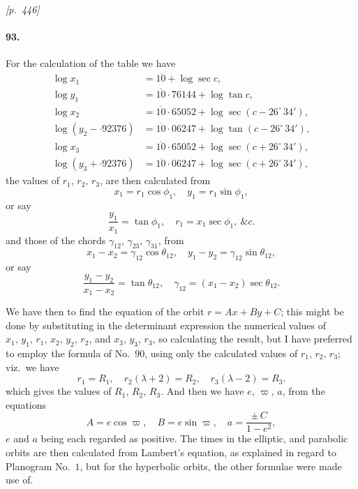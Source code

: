 \documentclass[11pt]{article}
\begin{document}
\medskip
\noindent\textit{[p.~446]}

\medskip

\paragraph{93.} For the calculation of the table we have
\[
\begin{aligned}
\log x_{1} &= \overline{10} + \log\sec c,\\
\log y_{1} &= \overline{10}{\cdot}76144 + \log\tan c,\\
\log x_{2} &= \overline{10}{\cdot}65052 + \log\sec(c - 26^{\circ}\,34'),\\
\log(y_{2} - {\cdot}92376) &= \overline{10}{\cdot}06247 + \log\tan(c - 26^{\circ}\,34'),\\
\log x_{3} &= \overline{10}{\cdot}65052 + \log\sec(c + 26^{\circ}\,34'),\\
\log(y_{3} + {\cdot}92376) &= \overline{10}{\cdot}06247 + \log\sec(c + 26^{\circ}\,34'),
\end{aligned}
\]
the values of $r_{1},\, r_{2},\, r_{3}$, are then calculated from
\[
x_{1} = r_{1}\cos\phi_{1},\quad y_{1} = r_{1}\sin\phi_{1},
\]
or say
\[
\dfrac{y_{1}}{x_{1}} = \tan\phi_{1},\quad r_{1} = x_{1}\sec\phi_{1},\ \&c.
\]
and those of the chords $\gamma_{12},\, \gamma_{23},\, \gamma_{31}$, from
\[
x_{1} - x_{2} = \gamma_{12}\cos\theta_{12},\quad y_{1} - y_{2} = \gamma_{12}\sin\theta_{12},
\]
or say
\[
\dfrac{y_{1} - y_{2}}{x_{1} - x_{2}} = \tan\theta_{12},\quad \gamma_{12} = (x_{1} - x_{2})\sec\theta_{12}.
\]

We have then to find the equation of the orbit $r = Ax + By + C$; this might be done by substituting in the determinant expression the numerical values of $x_{1},\, y_{1},\, r_{1},\, x_{2},\, y_{2},\, r_{2}$, and $x_{3},\, y_{3},\, r_{3}$, so calculating the result, but I have preferred to employ the formula of No.~$90$, using only the calculated values of $r_{1},\, r_{2},\, r_{3}$; viz.\ we have
\[
r_{1} = R_{1},\quad r_{2}(\lambda + 2) = R_{2},\quad r_{3}(\lambda - 2) = R_{3}.
\]
which gives the values of $R_{1},\, R_{2},\, R_{3}$. And then we have $e,\, \varpi,\, a$, from the equations
\[
A = e\cos\varpi,\quad B = e\sin\varpi,\quad a = \dfrac{\pm\,C}{1 - e^{2}},
\]
$e$ and $a$ being each regarded as positive. The times in the elliptic, and parabolic orbits are then calculated from Lambert's equation, as explained in regard to Planogram No.~$1$, but for the hyperbolic orbits, the other formulae were made use of.
\end{document}
